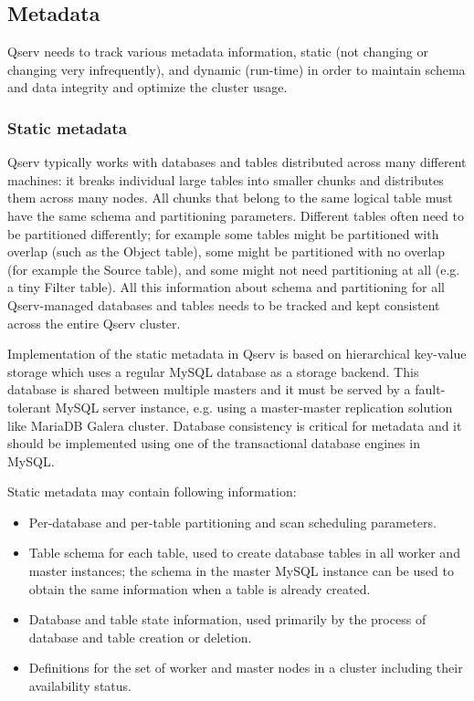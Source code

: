 \documentclass[DM,lsstdraft,toc]{lsstdoc}
\begin{document}
\subsection{Metadata}\label{metadata}

Qserv needs to track various metadata information, static (not changing
or changing very infrequently), and dynamic (run-time) in order to
maintain schema and data integrity and optimize the cluster usage.

\subsubsection{Static metadata}\label{static-metadata}

Qserv typically works with databases and tables distributed across many
different machines: it breaks individual large tables into smaller chunks and
distributes them across many nodes. All chunks that belong to the same logical
table must have the same schema and partitioning parameters. Different tables
often need to be partitioned differently; for example some tables might be
partitioned with overlap (such as the Object table), some might be partitioned
with no overlap (for example the Source table), and some might not need
partitioning at all (e.g. a tiny Filter table). All this information about
schema and partitioning for all Qserv-managed databases and tables needs to be
tracked and kept consistent across the entire Qserv cluster.

Implementation of the static metadata in Qserv is based on hierarchical
key-value storage which uses a regular MySQL database as a storage
backend. This database is shared between multiple masters and it must be
served by a fault-tolerant MySQL server instance, e.g. using a
master-master replication solution like MariaDB Galera cluster. Database
consistency is critical for metadata and it should be implemented using
one of the transactional database engines in MySQL.

Static metadata may contain following information:

\begin{itemize}
\item
  Per-database and per-table partitioning and scan scheduling
  parameters.
\item
  Table schema for each table, used to create database tables in all
  worker and master instances; the schema in the master MySQL instance
  can be used to obtain the same information when a table is already
  created.
\item
  Database and table state information, used primarily by the process of
  database and table creation or deletion.
\item
  Definitions for the set of worker and master nodes in a cluster
  including their availability status.
\end{itemize}
\end{document}

